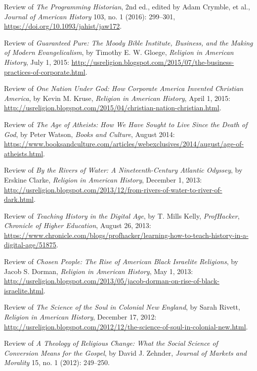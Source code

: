 \documentclass[11pt]{article}
\begin{document}
Review of \emph{The Programming Historian}, 2nd ed., edited by
Adam Crymble, et al., \emph{Journal of American History} 103, no. 1 (2016): 
299--301, \url{https://doi.org/10.1093/jahist/jaw172}.

Review of \emph{Guaranteed Pure: The Moody Bible Institute, Business, and the Making of Modern Evangelicalism}, by Timothy E. W. Gloege, \emph{Religion in American History}, July 1, 2015: \url{http://usreligion.blogspot.com/2015/07/the-business-practices-of-corporate.html}.

Review of \emph{One Nation Under God: How Corporate America Invented Christian America}, by Kevin M. Kruse, \emph{Religion in American History}, April 1, 2015: \url{http://usreligion.blogspot.com/2015/04/christian-nation-christian.html}.


Review of \emph{The Age of Atheists: How We Have Sought to Live Since the Death of God}, by Peter Watson, \emph{Books and Culture}, August 2014: \url{https://www.booksandculture.com/articles/webexclusives/2014/august/age-of-atheists.html}.

Review of \emph{By the Rivers of Water: A Nineteenth-Century Atlantic Odyssey}, by Erskine Clarke, \emph{Religion in American History}, December 1, 2013: \url{http://usreligion.blogspot.com/2013/12/from-rivers-of-water-to-river-of-dark.html}.

Review of \emph{Teaching History in the Digital Age}, by T. Mills Kelly, \emph{ProfHacker}, \emph{Chronicle of Higher Education}, August 26, 2013: \url{https://www.chronicle.com/blogs/profhacker/learning-how-to-teach-history-in-a-digital-age/51875}.

Review of \emph{Chosen People: The Rise of American Black Israelite Religions}, by Jacob S. Dorman, \emph{Religion in American History}, May 1, 2013: \url{http://usreligion.blogspot.com/2013/05/jacob-dorman-on-rise-of-black-israelite.html}.

Review of \emph{The Science of the Soul in Colonial New England}, by Sarah Rivett, \emph{Religion in American History}, December 17, 2012: \url{http://usreligion.blogspot.com/2012/12/the-science-of-soul-in-colonial-new.html}.

Review of \emph{A Theology of Religious Change: What the Social Science of Conversion Means for the Gospel}, by David J. Zehnder, \emph{Journal of Markets and Morality} 15, no. 1 (2012): 249--250.
\end{document}
